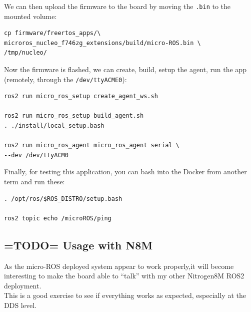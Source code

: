 \documentclass[10pt]{article}
\begin{document}
We can then upload the firmware to the board by moving the \verb|.bin| to the mounted volume:
\begin{tcolorbox}
\begin{verbatim}
cp firmware/freertos_apps/\
microros_nucleo_f746zg_extensions/build/micro-ROS.bin \
/tmp/nucleo/
\end{verbatim}
\end{tcolorbox}

Now the firmware is flashed, we can create, build, setup the agent, run the app (remotely, through the \verb|/dev/ttyACME0|):
\begin{tcolorbox}
\begin{verbatim}
ros2 run micro_ros_setup create_agent_ws.sh

ros2 run micro_ros_setup build_agent.sh
. ./install/local_setup.bash

ros2 run micro_ros_agent micro_ros_agent serial \
--dev /dev/ttyACM0
\end{verbatim}
\end{tcolorbox}

Finally, for testing this application, you can bash into the Docker from another term and run these:
\begin{tcolorbox}
\begin{verbatim}
. /opt/ros/$ROS_DISTRO/setup.bash

ros2 topic echo /microROS/ping
\end{verbatim}
\end{tcolorbox}

\subsection{=TODO= Usage with N8M}
\label{sec:usage-with-n8m}
As the micro-ROS deployed system appear to work properly,it will become interesting
to make the board able to ``talk'' with my other Nitrogen8M ROS2 deployment.\\

This is a good exercise to see if everything works as expected, especially at
the DDS level.
\end{document}

